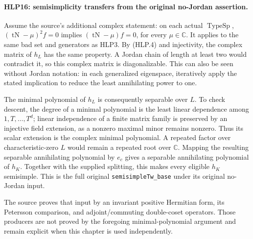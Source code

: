 \paragraph{HLP16: semisimplicity transfers from the original no-Jordan assertion.}
\label{claim:HLP16}
Assume the source's additional complex statement: on each actual
\(\operatorname{TypeSp}\),
\((\operatorname{tN}-\mu)^2f=0\) implies
\((\operatorname{tN}-\mu)f=0\), for every \(\mu\in\mathbb C\).
It applies to the same bad set and generators as HLP3. By (HLP.4)
and injectivity, the complex matrix of \(h_L\) has the same
property. A Jordan chain of length at least two would contradict
it, so this complex matrix is diagonalizable. This can also be
seen without Jordan notation: in each generalized eigenspace,
iteratively apply the stated implication to reduce the least
annihilating power to one.

The minimal polynomial of \(h_L\) is consequently separable over
\(L\). To check descent, the degree of a minimal polynomial is the
least linear dependence among \(1,T,\ldots,T^d\); linear
independence of a finite matrix family is preserved by an injective
field extension, as a nonzero maximal minor remains nonzero.
Thus its scalar extension is the complex minimal polynomial.
A repeated factor over characteristic-zero \(L\) would remain a
repeated root over \(\mathbb C\). Mapping the resulting separable
annihilating polynomial by \(e_c\) gives a separable annihilating
polynomial of \(h_K\). Together with the supplied splitting, this
makes every eligible \(h_K\) semisimple. This is the full original
\texttt{semisimpleTw\_base} under its original no-Jordan input.

The source proves that input by an invariant positive Hermitian
form, its Petersson comparison, and adjoint/commuting double-coset
operators. Those producers are not proved by the foregoing
minimal-polynomial argument and remain explicit when this chapter
is used independently.

